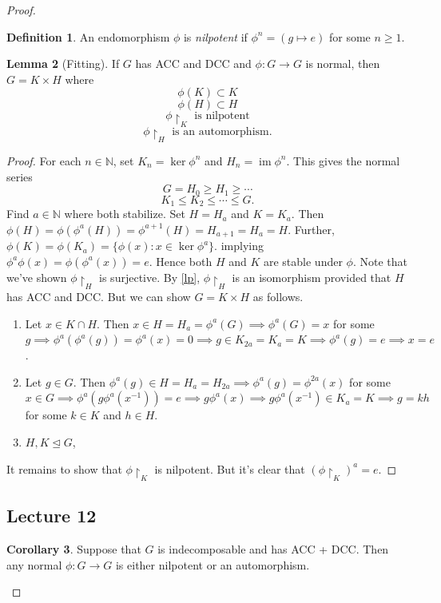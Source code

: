 \documentclass[10pt,letterpaper,cm]{nupset}
\theoremstyle{definition}
\newtheorem{definition}{Definition}[subsection]
\theoremstyle{theorem}
\newtheorem{lemma}[definition]{Lemma}
\newtheorem{corollary}[definition]{Corollary}
\theoremstyle{remark}
\newcommand{\N}{\mathbb N}
\newcommand{\1}{\mathbf{1}}
\newcommand{\0}{\vec 0}
\DeclareMathOperator{\im}{im}
\begin{document}
\begin{proof}
\begin{definition}
An endomorphism $\phi$ is \textit{nilpotent} if $\phi^n = (g \mapsto e)$ for some $n\geq 1$.
\end{definition}

\begin{lemma}[Fitting]
If $G$ has ACC and DCC and $\phi: G \to G$ is normal, then $G = K \times H$ where $$\phi(K) \subset K$$ $$\phi(H) \subset H$$ $$\phi \restriction_K \text{ is nilpotent}$$ $$\phi \restriction_H \text{ is an automorphism}.$$
\end{lemma}
\begin{proof}
For each $n\in \N$, set $K_n = \ker \phi^n$ and $H_n = \im \phi^n$. This gives the normal series $$G= H_0 \geq H_1 \geq \cdots$$ $$K_1 \leq K_2 \leq \cdots \leq G.$$ Find $a \in \N$ where both stabilize. Set $H = H_a$ and $K = K_a$. Then $\phi(H) = \phi(\phi^a(H)) = \phi^{a+1}(H) = H_{a+1} = H_a = H$. Further, $\phi(K) = \phi(K_a) = \{\phi(x) : x \in \ker \phi^a\}$. implying $\phi^a\phi(x) = \phi(\phi^a(x)) =e$. Hence both $H$ and $K$ are stable under $\phi$. Note that we've shown $\phi \restriction_H$ is surjective. By \cref{lp}, $\phi \restriction_H$ is an isomorphism provided that $H$ has ACC and DCC. But we can show $G = K \times H$ as follows.
\begin{enumerate}[label=(\alph*)]
\item Let $x \in K \cap H$. Then $x \in H = H_a = \phi^a(G) \implies \phi^a(G) = x$ for some $g \implies \phi^a(\phi^a(g)) = \phi^a(x) =  0 \implies g \in K_{2a} = K_a = K \implies \phi^a(g) = e \implies x =e$. 
\item Let $g \in G$. Then $ \phi^a(g) \in H = H_a = H_{2a} \implies \phi^a(g) = \phi^{2a}(x)$ for some $x\in G \implies \phi^a(g \phi^a(x^{-1})) =e \implies g\phi^a(x) \implies g\phi^a(x^{-1}) \in K_a =K \implies g = kh$ for some $k\in K$ and $h\in H$.
\item $H, K \unlhd G$,
\end{enumerate}
It remains to show that $\phi \restriction_K$ is nilpotent. But it's clear that $(\phi \restriction_K)^a = e$.
\end{proof}

\subsection{Lecture 12}

\begin{corollary} 
Suppose that $G$ is indecomposable and has ACC + DCC. Then any normal $\phi : G \to G$ is either nilpotent or an automorphism.
\end{corollary}


\end{proof}
\end{document}
